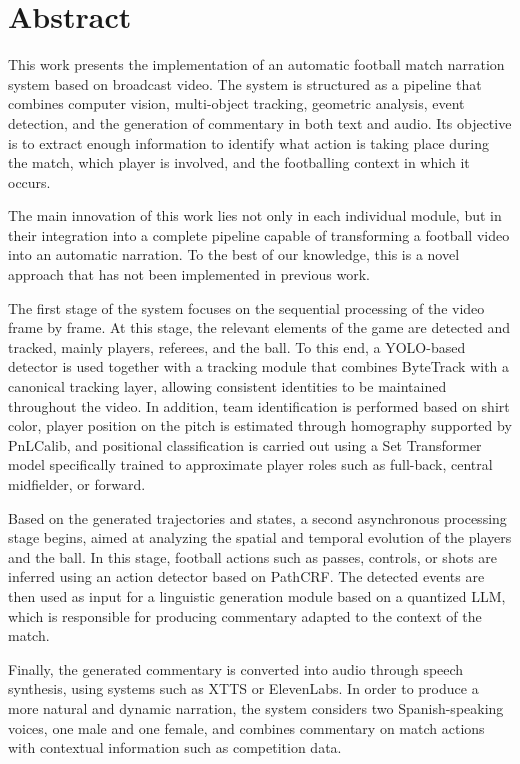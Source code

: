 \chapter*{\textbf{Abstract}}
\vspace{-2cm}

\begingroup
\setlength{\parskip}{0.8em}
\setlength{\parindent}{0pt}

This work presents the implementation of an automatic football match narration system based on broadcast video. The system is structured as a pipeline that combines computer vision, multi-object tracking, geometric analysis, event detection, and the generation of commentary in both text and audio. Its objective is to extract enough information to identify what action is taking place during the match, which player is involved, and the footballing context in which it occurs.

The main innovation of this work lies not only in each individual module, but in their integration into a complete pipeline capable of transforming a football video into an automatic narration. To the best of our knowledge, this is a novel approach that has not been implemented in previous work.

The first stage of the system focuses on the sequential processing of the video frame by frame. At this stage, the relevant elements of the game are detected and tracked, mainly players, referees, and the ball. To this end, a YOLO-based detector is used together with a tracking module that combines ByteTrack with a canonical tracking layer, allowing consistent identities to be maintained throughout the video. In addition, team identification is performed based on shirt color, player position on the pitch is estimated through homography supported by PnLCalib, and positional classification is carried out using a Set Transformer model specifically trained to approximate player roles such as full-back, central midfielder, or forward.

Based on the generated trajectories and states, a second asynchronous processing stage begins, aimed at analyzing the spatial and temporal evolution of the players and the ball. In this stage, football actions such as passes, controls, or shots are inferred using an action detector based on PathCRF. The detected events are then used as input for a linguistic generation module based on a quantized LLM, which is responsible for producing commentary adapted to the context of the match.

Finally, the generated commentary is converted into audio through speech synthesis, using systems such as XTTS or ElevenLabs. In order to produce a more natural and dynamic narration, the system considers two Spanish-speaking voices, one male and one female, and combines commentary on match actions with contextual information such as competition data.

